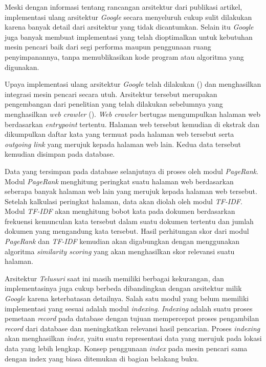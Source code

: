 Meski dengan informasi tentang rancangan arsitektur dari publikasi artikel,
implementasi ulang arsitektur \emph{Google} secara menyeluruh cukup sulit
dilakukan karena banyak detail dari arsitektur yang tidak dicantumkan. Selain
itu \emph{Google} juga banyak membuat implementasi yang telah dioptimalkan untuk
kebutuhan mesin pencari baik dari segi performa maupun penggunaan ruang
penyimpanannya, tanpa memublikasikan kode program atau algoritma yang digunakan.

Upaya implementasi ulang arsitektur \emph{Google} telah dilakukan
(\cite{lazuardy2023search}) dan menghasilkan integrasi mesin pencari secara
utuh. Arsitektur tersebut merupakan pengembangan dari penelitian yang telah
dilakukan sebelumnya yang menghasilkan \emph{web crawler}
(\cite{fathan2021crawler}). \emph{Web crawler} bertugas mengumpulkan halaman web
berdasarkan \emph{entrypoint} tertentu. Halaman web tersebut kemudian di ekstrak
dan dikumpulkan daftar kata yang termuat pada halaman web tersebut serta
\emph{outgoing link} yang merujuk kepada halaman web lain. Kedua data tersebut
kemudian disimpan pada database.

Data yang tersimpan pada database selanjutnya di proses oleh modul
\emph{PageRank}. Modul \emph{PageRank} menghitung peringkat suatu halaman web
berdasarkan seberapa banyak halaman web lain yang merujuk kepada halaman web
tersebut. Setelah kalkulasi peringkat halaman, data akan diolah oleh modul
\emph{TF-IDF}. Modul \emph{TF-IDF} akan menghitung bobot kata pada dokumen
berdasarkan frekuensi kemunculan kata tersebut dalam suatu dokumen tertentu dan
jumlah dokumen yang mengandung kata tersebut. Hasil perhitungan skor dari modul
\emph{PageRank} dan \emph{TF-IDF} kemudian akan digabungkan dengan menggunakan
algoritma \emph{similarity scoring} yang akan menghasilkan skor relevansi suatu
halaman.

Arsitektur \textit{Telusuri} saat ini masih memiliki berbagai kekurangan, dan
implementasinya juga cukup berbeda dibandingkan dengan arsitektur milik
\emph{Google} karena keterbatasan detailnya. Salah satu modul yang belum
memiliki implementasi yang sesuai adalah modul \emph{indexing}. \emph{Indexing}
adalah suatu proses pemetaan \emph{record} pada database dengan tujuan
mempercepat proses pengambilan \emph{record} dari database dan meningkatkan
relevansi hasil pencarian. Proses \emph{indexing} akan menghasilkan
\emph{index}, yaitu suatu representasi data yang merujuk pada lokasi data yang
lebih lengkap. Konsep penggunaan \emph{index} pada mesin pencari sama dengan
index yang biasa ditemukan di bagian belakang buku.

